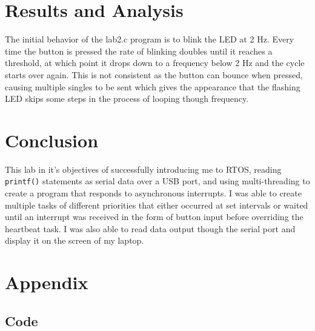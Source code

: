 \documentclass[sigconf]{article}
\begin{document}
\section*{Results and Analysis}

The initial behavior of the lab2.c program is to blink the LED at 2 Hz. Every time the button is pressed the rate of blinking doubles until it reaches a threshold, at which point it drops down to a frequency below 2 Hz and the cycle starts over again. This is not consistent as the button can bounce when pressed, causing multiple singles to be sent which gives the appearance that the flashing LED skips some steps in the process of looping though frequency. 


\section*{Conclusion}

This lab in it's objectives of successfully introducing me to RTOS, reading \lstinline{printf()} statements as serial data over a USB port, and using multi-threading to create a program that responds to asynchronous interrupts. I was able to create multiple tasks of different priorities that either occurred at set intervals or waited until an interrupt was received in the form of button input before overriding the heartbeat task. I was also able to read data output though the serial port and display it on the screen of my laptop.

\clearpage
\section*{Appendix}
\subsection*{Code}
\end{document}
